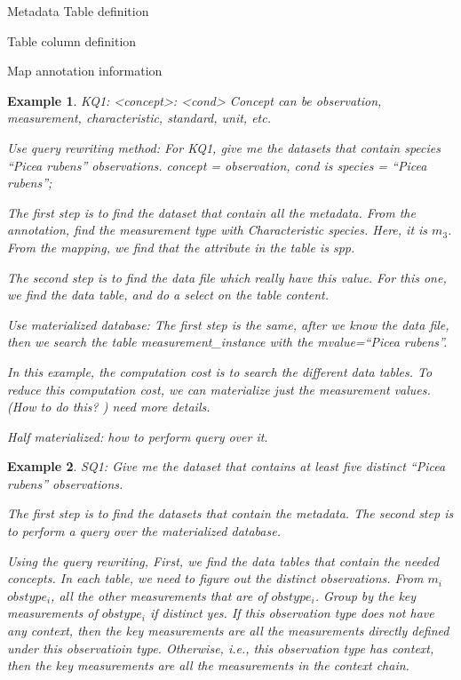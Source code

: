 \documentclass[10pt]{article}
\newtheorem{example}{Example}[section]
\begin{document}
Metadata
Table definition

Table column definition

Map annotation information 

\begin{example}
KQ1: <concept>: <cond>
Concept can be observation, measurement, characteristic, standard,
unit, etc. 

Use query rewriting method: 
For KQ1, give me the datasets that contain species ``Picea rubens''
observations.
concept = observation, cond is species = ``Picea rubens''; 

The first step is to find the dataset that contain all the metadata. 
From the annotation, find the {\em measurement type} with {\em
  Characteristic} species. 
Here, it is $m_3$. From the mapping, we find that the attribute in the
table is {\em spp}. 

The second step is to find the data file which really have this
value. 
For this one, we find the data table, and do a select on the table
content. 

Use materialized database: 
The first step is the same, after we know the data file, then we
search the table {\em measurement\_instance} with the {\em mvalue=``Picea rubens''}. 

In this example, the computation cost is to search the different data
tables. To reduce this computation cost, we can materialize just the
measurement values. (How to do this? ) need more details. 

Half materialized: how to perform query over it. 
\end{example}

\begin{example}
SQ1: Give me the dataset that contains at least five distinct ``Picea
rubens'' observations.

The first step is to find the datasets that contain the metadata. 
The second step is to perform a query over the materialized database. 

Using the query rewriting, 
First, we find the data tables that contain the needed concepts. 
In each table, we need to figure out the distinct observations. 
From $m_i$ $obstype_i$, all the other measurements that are of
$obstype_i$. 
Group by the key measurements of $obstype_i$ if distinct yes.
If this observation type does not have any context, then the key
measurements are all the measurements directly defined under this
observatioin type. Otherwise, i.e., this observation type has context,
then the key measurements are all the measurements in the context
chain. 
\end{example}
\end{document}
